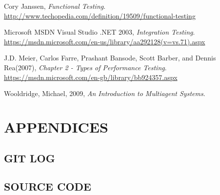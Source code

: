 \documentclass[11pt,a4paper]{article}
\begin{document}
\begin{thebibliography}{9}
	Cory Janssen,
	\emph{Functional Testing}.
	\url{http://www.techopedia.com/definition/19509/functional-testing}
	
	Microsoft MSDN Visual Studio .NET 2003,
	\emph{Integration Testing}.
	\url{https://msdn.microsoft.com/en-us/library/aa292128(v=vs.71).aspx}
	
	J.D. Meier, Carlos Farre, Prashant Bansode, Scott Barber, and Dennis Rea(2007),
	\emph{Chapter 2 - Types of Performance Testing}.
	\url{https://msdn.microsoft.com/en-gb/library/bb924357.aspx}
	
	Wooldridge, Michael,  2009,
	\emph{An Introduction to Multiagent Systems}.
	
\end{thebibliography}

\newpage

\section{APPENDICES}

\subsection{GIT LOG}



\subsection{SOURCE CODE}


\end{document}
